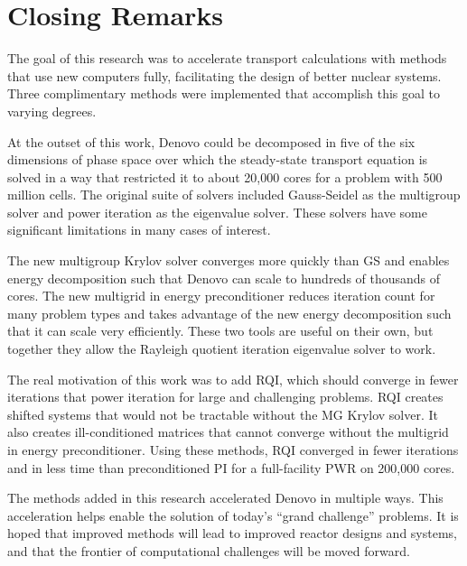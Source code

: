 \section{Closing Remarks}
The goal of this research was to accelerate transport calculations with methods that use new computers fully, facilitating the design of better nuclear systems. Three complimentary methods were implemented that accomplish this goal to varying degrees. 

At the outset of this work, Denovo could be decomposed in five of the six dimensions of phase space over which the steady-state transport equation is solved in a way that restricted it to about 20,000 cores for a problem with 500 million cells. The original suite of solvers included Gauss-Seidel as the multigroup solver and power iteration as the eigenvalue solver. These solvers have some significant limitations in many cases of interest. 

The new multigroup Krylov solver converges more quickly than GS and enables energy decomposition such that Denovo can scale to hundreds of thousands of cores. The new multigrid in energy preconditioner reduces iteration count for many problem types and takes advantage of the new energy decomposition such that it can scale very efficiently. These two tools are useful on their own, but together they allow the Rayleigh quotient iteration eigenvalue solver to work.

The real motivation of this work was to add RQI, which should converge in fewer iterations that power iteration for large and challenging problems. RQI creates shifted systems that would not be tractable without the MG Krylov solver. It also creates ill-conditioned matrices that cannot converge without the multigrid in energy preconditioner. Using these methods, RQI converged in fewer iterations and in less time than preconditioned PI for a full-facility PWR on 200,000 cores. 

The methods added in this research accelerated Denovo in multiple ways. This acceleration helps enable the solution of today's ``grand challenge'' problems. It is hoped that improved methods will lead to improved reactor designs and systems, and that the frontier of computational challenges will be moved forward.  


\separatorpage{}
